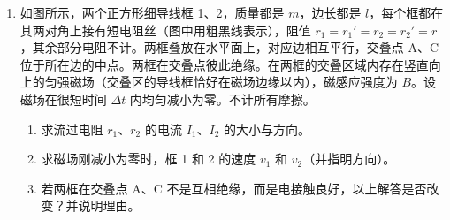 \documentclass[\gkver]{gaokaozhenti}
\begin{document}
\begin{enumerate}
\item
如图所示，两个正方形细导线框 1、2，质量都是 $m$，边长都是 $l$，每个框都在其两对角上接有短电阻丝（图中用粗黑线表示），阻值 $r_{1} = r_{1}' = r_{2} = r_{2}' = r$，其余部分电阻不计。两框叠放在水平面上，对应边相互平行，交叠点 A、C 位于所在边的中点。两框在交叠点彼此绝缘。在两框的交叠区域内存在竖直向上的匀强磁场（交叠区的导线框恰好在磁场边缘以内），磁感应强度为 $B$。设磁场在很短时间 $\Delta t$ 内均匀减小为零。不计所有摩擦。
\begin{enumerate}
	\item
	求流过电阻 $r_{1}$、$r_{2}$ 的电流 $I_{1}$、$I_{2}$ 的大小与方向。
	\item
	求磁场刚减小为零时，框 1 和 2 的速度 $v_{1}$ 和 $v_{2}$（并指明方向）。
	\item
	若两框在交叠点 A、C 不是互相绝缘，而是电接触良好，以上解答是否改变？并说明理由。
\end{enumerate}
\onepicture[align=right, w=7.02cm]{}
\end{enumerate}
\end{document}
